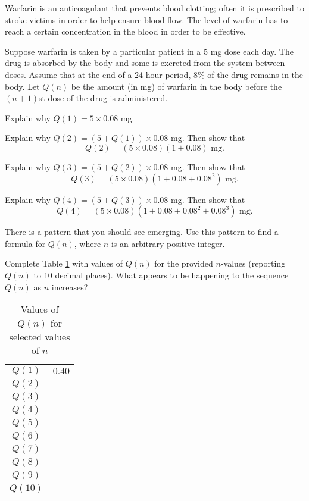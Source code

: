 \begin{pa} \label{PA:8.2}
Warfarin is an anticoagulant that prevents blood clotting; often it is prescribed to stroke victims in order  to help ensure blood flow. The level of warfarin has to reach a certain concentration in the blood in order to be effective. 

Suppose warfarin is taken by a particular patient in a 5 mg dose each day. The drug is absorbed by the body and some is excreted from the system between doses. Assume that at the end of a 24 hour period, 8\% of the drug remains in the body. Let $Q(n)$ be the amount (in mg) of warfarin in the body before the $(n+1)$st dose of the drug is administered.

\ba
\item Explain why $Q(1) = 5 \times 0.08$ mg.

\item Explain why $Q(2) = (5+Q(1)) \times 0.08$ mg. Then show that 
\[Q(2) = (5 \times 0.08)\left(1+0.08\right) \text{ mg}.\]

\item Explain why $Q(3) = (5+Q(2)) \times 0.08$ mg. Then show that
\[Q(3) = (5 \times 0.08)\left(1+0.08+0.08^2\right) \text{ mg}.\]

\item Explain why $Q(4) = (5+Q(3)) \times 0.08$ mg. Then show that
\[Q(4) = (5 \times 0.08)\left(1+0.08+0.08^2+0.08^3\right) \text{ mg}.\]

\item There is a pattern that you should see emerging. Use this pattern to find a formula for $Q(n)$, where $n$ is an arbitrary positive integer.

\item Complete Table \ref{T:8.2_Warfarin} with values of $Q(n)$ for the provided $n$-values (reporting $Q(n)$ to 10 decimal places). What appears to be happening to the sequence $Q(n)$ as $n $ increases?
\begin{table}[ht]
\begin{center}
\renewcommand{\arraystretch}{1.5}
\begin{tabular}{c|c}
$Q(1)$   & $0.40$ \\
$Q(2)$   & \\
$Q(3)$   &  \\
$Q(4)$   &  \\
$Q(5)$   &  \\
$Q(6)$   &  \\
$Q(7)$   &  \\
$Q(8)$   &  \\
$Q(9)$   &  \\
$Q(10)$  &  \\
\end{tabular}
\caption{Values of $Q(n)$ for selected values of $n$}
\label{T:8.2_Warfarin}
\end{center}
\end{table}



\end{pa}
